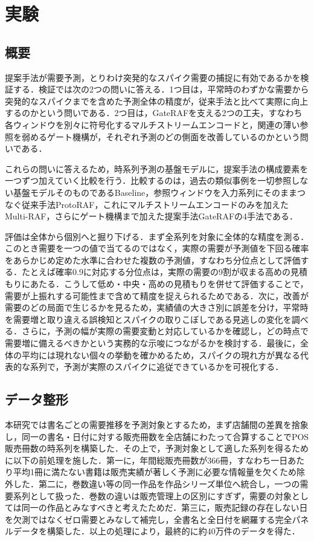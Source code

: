 \documentclass[twocolumn, lastpage]{jarticle}
\begin{document}
\section{実験}
\subsection{概要}
提案手法が需要予測，とりわけ突発的なスパイク需要の捕捉に有効であるかを検証する．検証では次の2つの問いに答える．1つ目は，平常時のわずかな需要から突発的なスパイクまでを含めた予測全体の精度が，従来手法と比べて実際に向上するのかという問いである．2つ目は，GateRAFを支える2つの工夫，すなわち各ウィンドウを別々に符号化するマルチストリームエンコードと，関連の薄い参照を弱めるゲート機構が，それぞれ予測のどの側面を改善しているのかという問いである．

これらの問いに答えるため，時系列予測の基盤モデルに，提案手法の構成要素を一つずつ加えていく比較を行う．比較するのは，過去の類似事例を一切参照しない基盤モデルそのものであるBaseline，参照ウィンドウを入力系列にそのままつなぐ従来手法ProtoRAF，これにマルチストリームエンコードのみを加えたMulti-RAF，さらにゲート機構まで加えた提案手法GateRAFの4手法である．

評価は全体から個別へと掘り下げる．まず全系列を対象に全体的な精度を測る．このとき需要を一つの値で当てるのではなく，実際の需要が予測値を下回る確率をあらかじめ定めた水準に合わせた複数の予測値，すなわち分位点として評価する．たとえば確率0.9に対応する分位点は，実際の需要の9割が収まる高めの見積もりにあたる．こうして低め・中央・高めの見積もりを併せて評価することで，需要が上振れする可能性まで含めて精度を捉えられるためである．次に，改善が需要のどの局面で生じるかを見るため，実績値の大きさ別に誤差を分け，平常時を需要増と取り違える誤検知とスパイクの取りこぼしである見逃しの変化を調べる．さらに，予測の幅が実際の需要変動と対応しているかを確認し，どの時点で需要増に備えるべきかという実務的な示唆につながるかを検討する．最後に，全体の平均には現れない個々の挙動を確かめるため，スパイクの現れ方が異なる代表的な系列で，予測が実際のスパイクに追従できているかを可視化する．


\subsection{データ整形}
本研究では書名ごとの需要推移を予測対象とするため，まず店舗間の差異を捨象し，同一の書名・日付に対する販売冊数を全店舗にわたって合算することでPOS販売冊数の時系列を構築した．その上で，予測対象として適した系列を得るために以下の前処理を施した．第一に，年間総販売冊数が366冊，すなわち一日あたり平均1冊に満たない書籍は販売実績が著しく予測に必要な情報量を欠くため除外した．第二に，巻数違い等の同一作品を作品シリーズ単位へ統合し，一つの需要系列として扱った．巻数の違いは販売管理上の区別にすぎず，需要の対象としては同一の作品とみなすべきと考えたためだ．第三に，販売記録の存在しない日を欠測ではなくゼロ需要とみなして補完し，全書名と全日付を網羅する完全パネルデータを構築した．以上の処理により，最終的に約40万件のデータを得た．
\end{document}
